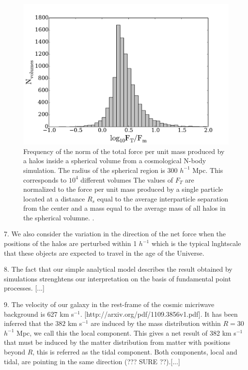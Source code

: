 \documentclass{article}
\begin{document}
\begin{figure}
\begin{center}
\includegraphics[width=0.8\linewidth,angle=0]{spheres_nbody.pdf}
\caption{\label{fig:sphere_nbody} Frequency of the norm of the total
  force per unit mass produced by a halos inside a spherical volume
  from a cosmological N-body simulation. The radius of the spherical
  region is $300$ $h^{-1}$ Mpc. This corresponds to $10^4$ different volumes 
 The values of $F_T$ are normalized to the force per unit mass
 produced by a single particle located at a distance $R_s$ equal to
 the average interparticle separation from the center and a mass equal
 to the average mass of all halos in the spherical volumne. 
\label{fig:sphere_nbody}.} 
\end{center}
\end{figure}



7. We also consider the variation in the direction of the net force
when the positions of the halos are perturbed within 1 $h^{-1}$ which
is the typical lnghtscale that these objects are expected to travel in
the age of the Universe.


8. The fact that our simple analytical model describes the result
obtained by simulations strenghtens our interpretation on the basis of
fundamental point processes. [...]

9. The velocity of our galaxy in the rest-frame of the cosmic
micriwave background is 627 km
s$^{-1}$. [http://arxiv.org/pdf/1109.3856v1.pdf]. It has been inferred
that the $382$ km s$^{-1}$ are induced by the mass distribution within
$R=30$ $h^{-1}$ Mpc, we call this the local component. This gives a
net result of 382 km s$^{-1}$ that must be induced by the matter
distribution from matter with positions beyond $R$, this is referred
as the tidal component.  Both components, local and tidal, are
pointing in the same direction (??? SURE ??).[...]
\end{document}
